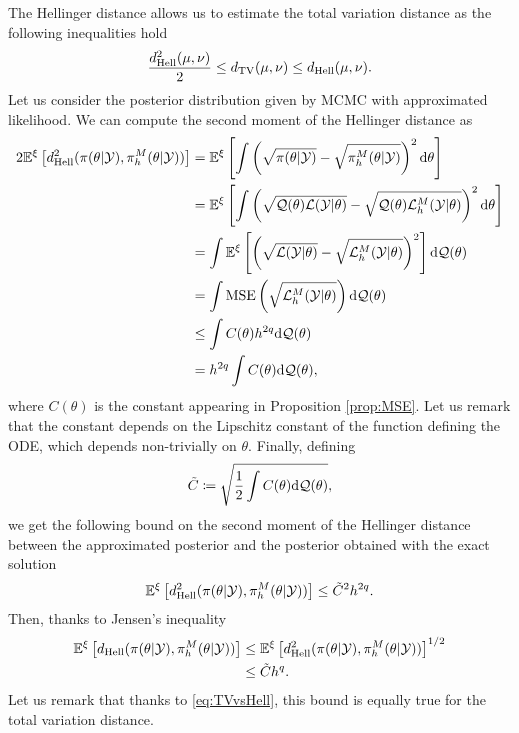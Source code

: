 \noindent The Hellinger distance allows us to estimate the total variation distance as the following inequalities hold \cite{GiS02}
\begin{equation}\label{eq:TVvsHell}
	\frac{d_{\mathrm{Hell}}^2(\mu, \nu)}{2} \leq d_{\mathrm{TV}}(\mu, \nu) \leq d_{\mathrm{Hell}}(\mu, \nu).
\end{equation}
Let us consider the posterior distribution given by MCMC with approximated likelihood. We can compute the second moment of the Hellinger distance as
\begin{equation}
\begin{aligned}
2\mathbb{E}^\xi\left[d_{\mathrm{Hell}}^2(\pi(\theta|\mathcal{Y}),\pi^M_h(\theta|\mathcal{Y}))\right] &= \mathbb{E}^\xi\left[\int \left(\sqrt{\pi(\theta|\mathcal{Y})} - \sqrt{\pi^M_h(\theta|\mathcal{Y})}\right)^2 \dd \theta\right] \\
&= \mathbb{E}^\xi\left[\int \left(\sqrt{\mathcal{Q}(\theta) \mathcal{L}(\mathcal{Y}|\theta)} - \sqrt{\mathcal{Q}(\theta) \mathcal{L}^M_h(\mathcal{Y}|\theta)}\right)^2 \dd \theta \right]\\
&= \int \mathbb{E}^\xi\left[\left(\sqrt{\mathcal{L}(\mathcal{Y}|\theta)} - \sqrt{\mathcal{L}^M_h(\mathcal{Y}|\theta)}\right)^2\right] \dd \mathcal{Q}(\theta)  \\
&= \int \operatorname{MSE}\left(\sqrt{\mathcal{L}^M_h(\mathcal Y|\theta)}\right) \dd \mathcal{Q}(\theta) \\
&\leq \int C(\theta)h^{2q} \dd \mathcal{Q}(\theta) \\
&= h^{2q} \int C(\theta) \dd \mathcal{Q}(\theta),
\end{aligned}
\end{equation}
where $C(\theta)$ is the constant appearing in Proposition \ref{prop:MSE}. Let us remark that the constant depends on the Lipschitz constant of the function defining the ODE, which depends non-trivially on $\theta$. Finally, defining 
\begin{equation}
	\tilde C \coloneqq \sqrt{\frac{1}{2} \int C(\theta) \dd \mathcal{Q}(\theta)}, 
\end{equation}
we get the following bound on the second moment of the Hellinger distance between the approximated posterior and the posterior obtained with the exact solution 
\begin{equation}
	\mathbb{E}^\xi\left[d_{\mathrm{Hell}}^2(\pi(\theta|\mathcal{Y}),\pi^M_h(\theta|\mathcal{Y}))\right] \leq \tilde C^2 h^{2q}.
\end{equation}
Then, thanks to Jensen's inequality
\begin{equation}
\begin{aligned}
	\mathbb{E}^\xi\left[d_{\mathrm{Hell}}(\pi(\theta|\mathcal{Y}),\pi^M_h(\theta|\mathcal{Y}))\right] &\leq \mathbb{E}^\xi\left[d_{\mathrm{Hell}}^2(\pi(\theta|\mathcal{Y}),\pi^M_h(\theta|\mathcal{Y}))\right]^{1/2} \\
	&\leq \tilde C h^q.
\end{aligned}
\end{equation}
Let us remark that thanks to \eqref{eq:TVvsHell}, this bound is equally true for the total variation distance. 

